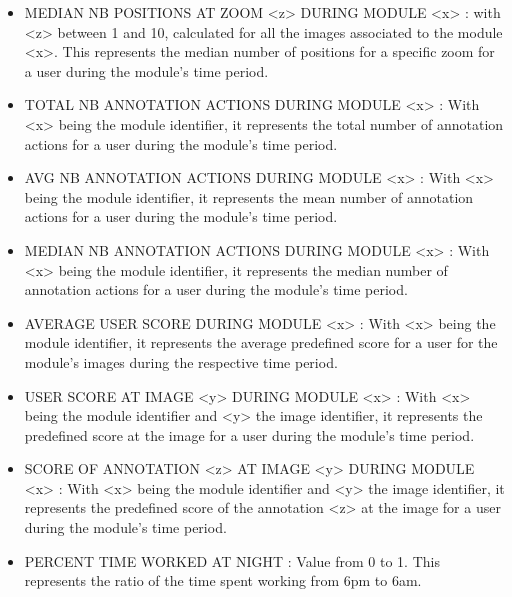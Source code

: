 \documentclass[a4paper,11pt]{report}
\numberwithin{figure}{section} %
\begin{document}
\begin{itemize}
	\item[\textbullet] MEDIAN NB POSITIONS AT ZOOM <z> DURING MODULE <x> : with <z> between 1 and 10, calculated for all the images associated to the module <x>.
	This represents the median number of positions for a specific zoom for
a user during the module's time period. \\ 
	
	\item[\textbullet] TOTAL NB ANNOTATION ACTIONS DURING MODULE <x> : With <x> being the module identifier, it represents the total number of annotation  actions for a user during the module's time period. \\ 
	
	\item[\textbullet] AVG NB ANNOTATION ACTIONS DURING MODULE <x> : With <x> being the module identifier, it represents the mean number of annotation  actions for a user during the module's time period. \\ 
		
	\item[\textbullet] MEDIAN NB ANNOTATION ACTIONS DURING MODULE <x> : With <x> being the module identifier, it represents the median number of annotation  actions for a user during the module's time period. \\ 

	\item[\textbullet] AVERAGE USER SCORE DURING MODULE <x> : With <x> being the module identifier, it represents the average predefined score for a user for the module's images during the respective time period. \\ 
    
	\item[\textbullet] USER SCORE AT IMAGE <y> DURING MODULE <x> : With <x> being the module identifier and <y> the image identifier, it represents the predefined score at the image for a user during the module's time period. \\     
	
	\item[\textbullet] SCORE OF ANNOTATION <z> AT IMAGE <y> DURING MODULE <x> : With <x> being the module identifier and <y> the image identifier, it represents the predefined score of the annotation <z> at the image for a user during the module's time period. \\     
         
    \item[\textbullet] PERCENT TIME WORKED AT NIGHT : Value from 0 to 1.
    This represents the ratio of the time spent working from 6pm to 6am.
    

\end{itemize}
\end{document}
